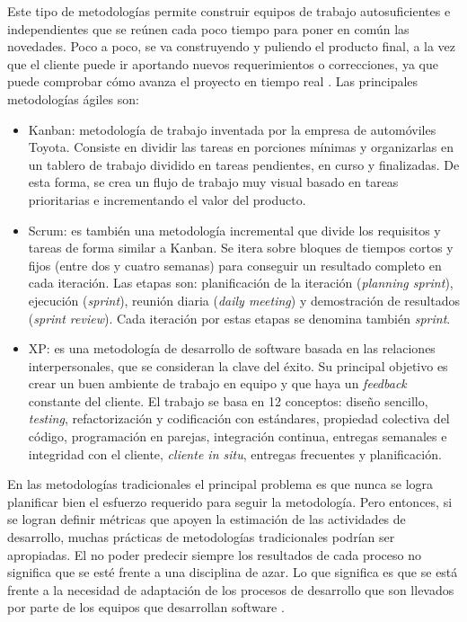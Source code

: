 {    Este tipo de metodologías permite construir equipos de trabajo autosuficientes e independientes que se reúnen cada poco tiempo para poner en común las novedades. Poco a poco, se va construyendo y puliendo el producto final, a la vez que el cliente puede ir aportando nuevos requerimientos o correcciones, ya que puede comprobar cómo avanza el proyecto en tiempo real \citep{pacienzia2015metodologias}. 
    Las principales metodologías ágiles son:
    \begin{itemize}
    	\item Kanban: metodología de trabajo inventada por la empresa de automóviles Toyota. Consiste en dividir las tareas en porciones mínimas y organizarlas en un tablero de trabajo dividido en tareas pendientes, en curso y finalizadas. De esta forma, se crea un flujo de trabajo muy visual basado en tareas prioritarias e incrementando el valor del producto.
    	\item Scrum: es también una metodología incremental que divide los requisitos y tareas de forma similar a Kanban. Se itera sobre bloques de tiempos cortos y fijos (entre dos y cuatro semanas) para conseguir un resultado completo en cada iteración. Las etapas son: planificación de la iteración (\textit{planning sprint}), ejecución (\textit{sprint}), reunión diaria (\textit{daily meeting}) y demostración de resultados (\textit{sprint review}). Cada iteración por estas etapas se denomina también \textit{sprint}. 
    	\item \ac{XP}: es una metodología de desarrollo de software basada en las relaciones interpersonales, que se consideran la clave del éxito. Su principal objetivo es crear un buen ambiente de trabajo en equipo y que haya un \textit{feedback} constante del cliente. El trabajo se basa en 12 conceptos: diseño sencillo, \textit{testing}, refactorización y codificación con estándares, propiedad colectiva del código, programación en parejas, integración continua, entregas semanales e integridad con el cliente, \textit{cliente in situ}, entregas frecuentes y planificación.
    \end{itemize}
    
    
    En las metodologías tradicionales el principal problema es que nunca se logra planificar bien el esfuerzo requerido para seguir la metodología. Pero entonces, si se logran definir métricas que apoyen la estimación de las actividades de desarrollo, muchas prácticas de metodologías tradicionales podrían ser apropiadas. El no poder predecir siempre los resultados de cada proceso no significa que se esté frente a una disciplina de azar. Lo que significa es que se está frente a la necesidad de adaptación de los procesos de desarrollo que son llevados por parte de los equipos que desarrollan software \citep{awad2005agile_v_traditional}.
    
}
